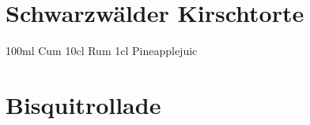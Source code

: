 \section{Schwarzwälder Kirschtorte}
\begin{zutaten}
100ml Cum
10cl Rum
1cl Pineapplejuic
\end{zutaten}
\clearpage
\section{Bisquitrollade}

\clearpage
